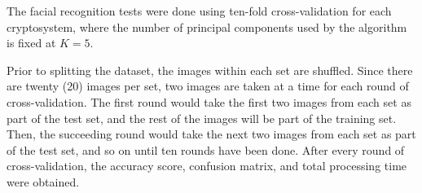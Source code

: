The facial recognition tests were done using ten-fold cross-validation for each cryptosystem, where the number of principal components used by the algorithm is fixed at $K=5$. 

Prior to splitting the dataset, the images within each set are shuffled. Since there are twenty (20) images per set, two images are taken at a time for each round of cross-validation. The first round would take the first two images from each set as part of the test set, and the rest of the images will be part of the training set. Then, the succeeding round would take the next two images from each set as part of the test set, and so on until ten rounds have been done. After every round of cross-validation, the accuracy score, confusion matrix, and total processing time were obtained. 


